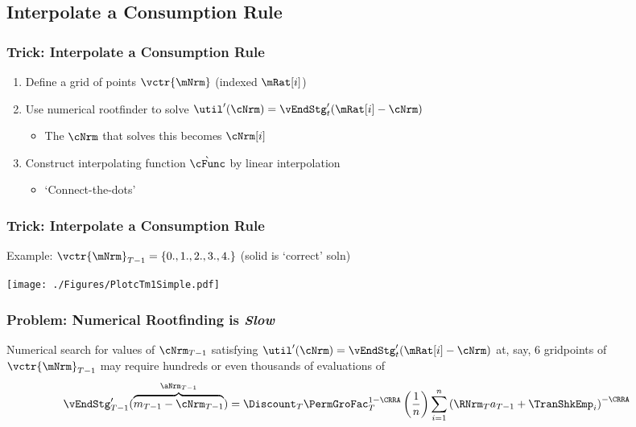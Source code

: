 \documentclass{beamer}
\begin{document}
\subsection{Interpolate a Consumption Rule}
\begin{frame}
\frametitle{Trick: Interpolate a Consumption Rule}

\begin{enumerate}
\item Define a grid of points $\vctr{\mNrm}$ (indexed $\mRat[i]$)
\item Use numerical rootfinder to solve 
$\util^{\prime}(\cNrm) = \vEndStg^{\prime}_{t}(\mRat[i]-\cNrm)$
\begin{itemize}
\item The $\cNrm$ that solves this becomes $\cNrm[i]$
\end{itemize}
\item Construct interpolating function $\grave{\cFunc}$ by linear interpolation
\begin{itemize}
\item `Connect-the-dots'
\end{itemize}
\end{enumerate}

\end{frame}






\begin{frame}[label=DiscretizeEqn]
\frametitle{Trick: Interpolate a Consumption Rule}

Example: $\vctr{\mNrm}_{T-1} = \{0.,1.,2.,3.,4.\}$ (solid is `correct' soln)

\texttt{[image: ./Figures/PlotcTm1Simple.pdf]}

\end{frame}

\begin{frame}[label=vEndtSlow]
\frametitle{Problem: Numerical Rootfinding is {\it Slow}}

Numerical search for values of $\cNrm_{T-1}$ satisfying
$\util^{\prime}(\cNrm) = \vEndStg^{\prime}_{t}(\mRat[i]-\cNrm)$ at, say,
6 gridpoints of $\vctr{\mNrm}_{T-1}$ may require hundreds or even thousands of
evaluations of
\begin{equation}\begin{gathered}\begin{aligned}
        \vEndStg^{\prime}_{T-1}(\overbrace{{m}_{T-1}-\cNrm_{T-1}}^{\aNrm_{T-1}})  & =   \Discount_{T} \PermGroFac_{T}^{1-\CRRA}\left(\frac{1}{n}\right)\sum_{i=1}^{n}   \left( \RNrm_{T} a_{T-1} + \TranShkEmp_{i}\right)^{-\CRRA} \notag
\end{aligned}\end{gathered}\end{equation}

\end{frame}
\end{document}
